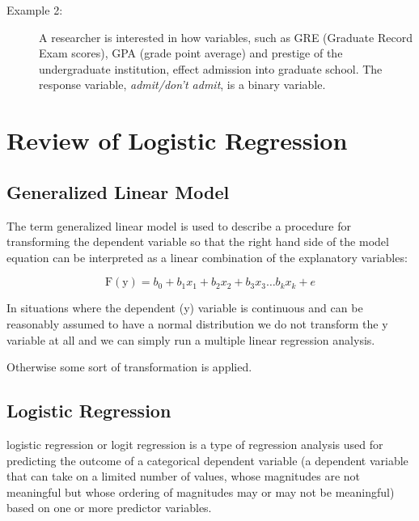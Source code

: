 \documentclass[a4paper,12pt]{article}
\begin{document}
{\begin{description}
	\item[Example 2:]  A researcher is interested in how variables, such as GRE (Graduate Record Exam scores), GPA (grade point average) and prestige of the undergraduate institution, effect admission into graduate school. The response variable, \textit{admit/don't admit}, is a binary variable.
\end{description}


\section{Review of Logistic Regression}

\subsection{Generalized Linear Model}

The term generalized linear model is used to describe a procedure for
transforming the dependent variable so that the right hand side of the model
equation can be interpreted as a linear combination of the explanatory variables:

\[ \operatorname{F(y)} = b_0 + b_1x_1 + b_2x_2 + b_3x_3 \ldots b_kx_k + e \]

In situations where the dependent (y) variable is continuous and can be
reasonably assumed to have a normal distribution we do not transform the y
variable at all and we can simply run a multiple linear regression analysis.

Otherwise some sort of transformation is applied.
\subsection{Logistic Regression}
logistic regression or logit regression is a type of regression analysis used for predicting
the outcome of a categorical dependent variable (a dependent variable that can take on a limited number of values,
whose magnitudes are not meaningful but whose ordering of magnitudes may or may not be meaningful)
based on one or more predictor variables.



}
\end{document}
